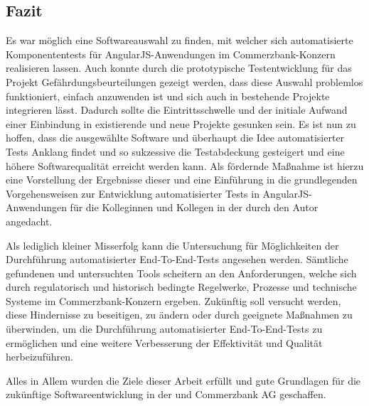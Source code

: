 \subsection{Fazit}
Es war möglich eine Softwareauswahl zu finden, mit welcher sich automatisierte Komponententests für AngularJS-Anwendungen im Commerzbank-Konzern realisieren lassen. Auch konnte durch die prototypische Testentwicklung für das Projekt Gefährdungsbeurteilungen gezeigt werden, dass diese Auswahl problemlos funktioniert, einfach anzuwenden ist und sich auch in bestehende Projekte integrieren lässt. Dadurch sollte die Eintrittsschwelle und der initiale Aufwand einer Einbindung in existierende und neue Projekte gesunken sein. Es ist nun zu hoffen, dass die ausgewählte Software und überhaupt die Idee automatisierter Tests Anklang findet und so sukzessive die Testabdeckung gesteigert und eine höhere Softwarequalität erreicht werden kann. Als fördernde Maßnahme ist hierzu eine Vorstellung der Ergebnisse dieser \titleDocument{} und eine Einführung in die grundlegenden Vorgehensweisen zur Entwicklung automatisierter Tests in AngularJS-Anwendungen für die Kolleginnen und Kollegen in der \domain{} durch den Autor angedacht.

Als lediglich kleiner Misserfolg kann die Untersuchung für Möglichkeiten der Durchführung automatisierter End-To-End-Tests angesehen werden. Sämtliche gefundenen und untersuchten Tools scheitern an den Anforderungen, welche sich durch regulatorisch und historisch bedingte Regelwerke, Prozesse und technische Systeme im Commerzbank-Konzern ergeben. Zukünftig soll versucht werden, diese Hindernisse zu beseitigen, zu ändern oder durch geeignete Maßnahmen zu überwinden, um die Durchführung automatisierter End-To-End-Tests zu ermöglichen und eine weitere Verbesserung der Effektivität und Qualität herbeizuführen.

Alles in Allem wurden die Ziele dieser Arbeit erfüllt und gute Grundlagen für die zukünftige Softwareentwicklung in der \domain{} und Commerzbank AG geschaffen.
